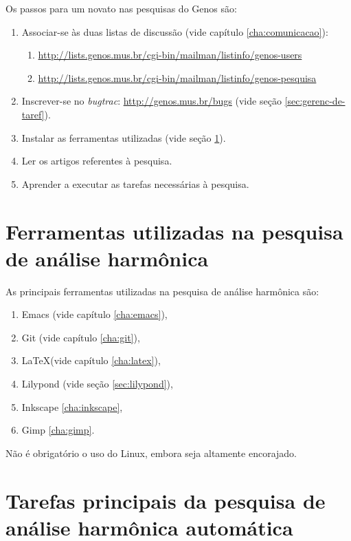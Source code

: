 \documentclass[12pt,brazil]{book}
\begin{document}
Os passos para um novato nas pesquisas do Genos são:

\begin{enumerate}
\item Associar-se às duas listas de discussão (vide capítulo
  \ref{cha:comunicacao}):
  \begin{enumerate}
  \item \url{http://lists.genos.mus.br/cgi-bin/mailman/listinfo/genos-users}
  \item \url{http://lists.genos.mus.br/cgi-bin/mailman/listinfo/genos-pesquisa}
  \end{enumerate}
\item Inscrever-se no \textit{bugtrac}: \url{http://genos.mus.br/bugs}
  (vide seção \ref{sec:gerenc-de-taref}).
\item Instalar as ferramentas utilizadas (vide seção
  \ref{sec:ferr-util-na}).
\item Ler os artigos referentes à pesquisa.
\item Aprender a executar as tarefas necessárias à pesquisa.
\end{enumerate}

\section{Ferramentas utilizadas na pesquisa de análise harmônica}
\label{sec:ferr-util-na}

As principais ferramentas utilizadas na pesquisa de análise harmônica
são:

\begin{enumerate}
\item Emacs (vide capítulo \ref{cha:emacs}),
\item Git (vide capítulo \ref{cha:git}),
\item \LaTeX (vide capítulo \ref{cha:latex}),
\item Lilypond (vide seção \ref{sec:lilypond}),
\item Inkscape \ref{cha:inkscape},
\item Gimp \ref{cha:gimp}.
\end{enumerate}

Não é obrigatório o uso do Linux, embora seja altamente encorajado.

\section{Tarefas principais da pesquisa de análise harmônica automática}
\label{sec:taref-princ-da}
\end{document}

